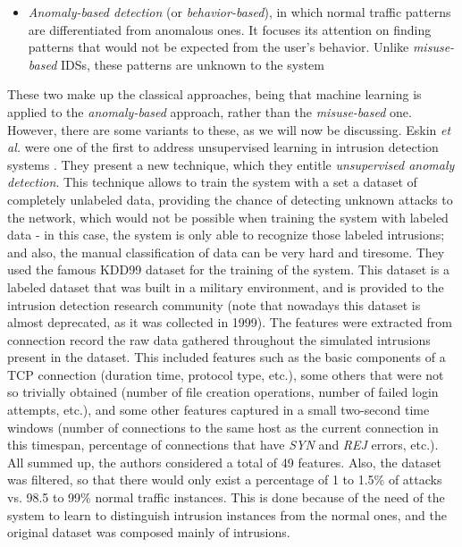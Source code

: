 \documentclass[runningheads,a4paper]{llncs}
\begin{document}
\begin{itemize}
  \item \textit{Anomaly-based detection} (or \textit{behavior-based}), in which normal traffic patterns are differentiated from anomalous ones. It focuses its attention on finding patterns that would not be expected from the user's behavior. Unlike \textit{misuse-based} IDSs, these patterns are unknown to the system
\end{itemize}

These two make up the classical approaches, being that machine learning is applied to the \textit{anomaly-based} approach, rather than the \textit{misuse-based} one. However, there are some variants to these, as we will now be discussing.
Eskin \textit{et al.} were one of the first to address unsupervised learning in intrusion detection systems \cite{LeonidPortnoy}. They present a new technique, which they entitle \textit{unsupervised anomaly detection}. This technique allows to train the system with a set a dataset of completely unlabeled data, providing the chance of detecting unknown attacks to the network, which would not be possible when training the system with labeled data - in this case, the system is only able to recognize those labeled intrusions; and also, the manual classification of data can be very hard and tiresome.
They used the famous KDD99 dataset for the training of the system. This dataset is a labeled dataset that was built in a military environment, and is provided to the intrusion detection research community (note that nowadays this dataset is almost deprecated, as it was collected in 1999). The features were extracted from connection record the raw data gathered throughout the simulated intrusions present in the dataset. This included features such as the basic components of a TCP connection (duration time, protocol type, etc.), some others that were not so trivially obtained (number of file creation operations, number of failed login attempts, etc.), and some other features captured in a small two-second time windows (number of connections to the same host as the current connection in this timespan, percentage of connections that have \textit{SYN} and \textit{REJ} errors, etc.). All summed up, the authors considered a total of 49 features. Also, the dataset was filtered, so that there would only exist a percentage of 1 to 1.5\% of attacks vs. 98.5 to 99\% normal traffic instances. This is done because of the need of the system to learn to distinguish intrusion instances from the normal ones, and the original dataset was composed mainly of intrusions.
\end{document}
